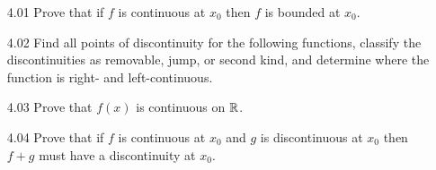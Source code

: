 \begin{enumerate}
   \item[4.01] Prove that if $f$ is continuous at $x_0$ then $f$ is bounded at
               $x_0$.
   \item[4.02] Find all points of discontinuity for the following functions,
               classify the discontinuities as removable, jump, or second kind,
               and determine where the function is right- and left-continuous.
   \item[4.03] Prove that $f(x)$ is continuous on $\mathbb{R}$.
   \item[4.04] Prove that if $f$ is continuous at $x_0$ and $g$ is discontinuous
               at $x_0$ then $f + g$ must have a discontinuity at $x_0$.
\end{enumerate}
